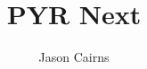 \documentclass[a4paper,10pt]{article}
\begin{document}
\title{PYR Next}
\author{Jason Cairns}
  
\maketitle{}


\printbibliography
\end{document}
